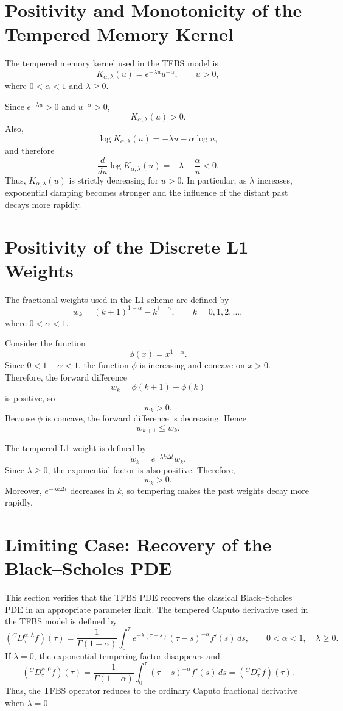 \documentclass[11pt,a4paper]{report}
\begin{document}
\section{Positivity and Monotonicity of the Tempered Memory Kernel}

The tempered memory kernel used in the TFBS model is
\[
K_{\alpha,\lambda}(u)
=
e^{-\lambda u}u^{-\alpha},
\qquad u>0,
\]
where $0<\alpha<1$ and $\lambda\ge0$.

Since $e^{-\lambda u}>0$ and $u^{-\alpha}>0$,
\[
K_{\alpha,\lambda}(u)>0.
\]
Also,
\[
\log K_{\alpha,\lambda}(u)
=
-\lambda u-\alpha\log u,
\]
and therefore
\[
\frac{d}{du}\log K_{\alpha,\lambda}(u)
=
-\lambda-\frac{\alpha}{u}<0.
\]
Thus, $K_{\alpha,\lambda}(u)$ is strictly decreasing for $u>0$. In particular, as $\lambda$ increases, exponential damping becomes stronger and the influence of the distant past decays more rapidly.

\section{Positivity of the Discrete L1 Weights}

The fractional weights used in the L1 scheme are defined by
\[
w_k
=
(k+1)^{1-\alpha}-k^{1-\alpha},
\qquad k=0,1,2,\dots,
\]
where $0<\alpha<1$.

Consider the function
\[
\phi(x)=x^{1-\alpha}.
\]
Since $0<1-\alpha<1$, the function $\phi$ is increasing and concave on $x>0$. Therefore, the forward difference
\[
w_k
=
\phi(k+1)-\phi(k)
\]
is positive, so
\[
w_k>0.
\]
Because $\phi$ is concave, the forward difference is decreasing. Hence
\[
w_{k+1}\le w_k.
\]

The tempered L1 weight is defined by
\[
\widetilde w_k
=
e^{-\lambda k\Delta t}w_k.
\]
Since $\lambda\ge0$, the exponential factor is also positive. Therefore,
\[
\widetilde w_k>0.
\]
Moreover, $e^{-\lambda k\Delta t}$ decreases in $k$, so tempering makes the past weights decay more rapidly.

\section{Limiting Case: Recovery of the Black--Scholes PDE}
\label{app:bs_limit}

This section verifies that the TFBS PDE recovers the classical Black--Scholes PDE in an appropriate parameter limit. The tempered Caputo derivative used in the TFBS model is defined by
\[
({}^C D_\tau^{\alpha,\lambda} f)(\tau)
=
\frac{1}{\Gamma(1-\alpha)}
\int_0^\tau
e^{-\lambda(\tau-s)}
(\tau-s)^{-\alpha}
f'(s)\,ds,
\qquad 0<\alpha<1,
\quad \lambda\ge0.
\]
If $\lambda=0$, the exponential tempering factor disappears and
\[
({}^C D_\tau^{\alpha,0} f)(\tau)
=
\frac{1}{\Gamma(1-\alpha)}
\int_0^\tau
(\tau-s)^{-\alpha}
f'(s)\,ds
=
({}^C D_\tau^\alpha f)(\tau).
\]
Thus, the TFBS operator reduces to the ordinary Caputo fractional derivative when $\lambda=0$.
\end{document}
